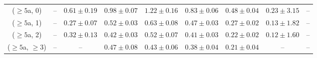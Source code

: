 \begin{table}[h!]
{\begin{tabular}{ccccccccc}
	($\ge5$a, 0) & -- & $0.61\pm 0.19$ & $0.98\pm 0.07$ & $1.22\pm 0.16$ & $0.83\pm 0.06$ & $0.48\pm 0.04$ & $0.23\pm 3.15$ & -- \\[0.5ex] 
	($\ge5$a, 1) & -- & $0.27\pm 0.07$ & $0.52\pm 0.03$ & $0.63\pm 0.08$ & $0.47\pm 0.03$ & $0.27\pm 0.02$ & $0.13\pm 1.82$ & -- \\[0.5ex] 
	($\ge5$a, 2) & -- & $0.32\pm 0.13$ & $0.42\pm 0.03$ & $0.52\pm 0.07$ & $0.41\pm 0.03$ & $0.22\pm 0.02$ & $0.12\pm 1.60$ & -- \\[0.5ex] 
	($\ge5$a, $\ge3$) & -- & -- & $0.47\pm 0.08$ & $0.43\pm 0.06$ & $0.38\pm 0.04$ & $0.21\pm 0.04$ & -- & -- \\[0.5ex] 
	\hline
	\hline
\end{tabular}}
\end{table}
